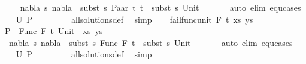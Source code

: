 \begin{isabellebody}
\ \ \isamarkupfalse%
\ {\isachardoublequoteopen}{\isasymnexists}\ nabla\ s{\isachardot}{\kern0pt}\ nabla\ {\isasymturnstile}\ subst\ s\ {\isacharparenleft}{\kern0pt}Paar\ t{}\ t{}{\isacharparenright}{\kern0pt}\ {\isasymapprox}\ subst\ s\ {\isacharparenleft}{\kern0pt}Unit{\isacharparenright}{\kern0pt}{\isachardoublequoteclose}\isanewline
\ \ \ \ \ \isamarkupfalse%
\ {\isacharparenleft}{\kern0pt}auto\ elim{\isacharcolon}{\kern0pt}\ equ{\isachardot}{\kern0pt}cases{\isacharparenright}{\kern0pt}\isanewline
\ \ \isamarkupfalse%
\ {\isachardoublequoteopen}U\ {\isacharquery}{\kern0pt}P\ {\isacharequal}{\kern0pt}\ {\isacharbraceleft}{\kern0pt}{\isacharbraceright}{\kern0pt}{\isachardoublequoteclose}\ \isanewline
\ \ \ \ \isamarkupfalse%
\ all{\isacharunderscore}{\kern0pt}solutions{\isacharunderscore}{\kern0pt}def\ \isamarkupfalse%
\ simp\isanewline
{}\isamarkupfalse%
\isanewline
\ \ \isamarkupfalse%
\ {\isacharparenleft}{\kern0pt}fail{\isacharunderscore}{\kern0pt}func{\isacharunderscore}{\kern0pt}unit\ F\ t{}\ xs\ ys{\isacharparenright}{\kern0pt}\isanewline
\ \ \isamarkupfalse%
\ {\isacharquery}{\kern0pt}P\ {\isacharequal}{\kern0pt}\ {\isachardoublequoteopen}{\isacharparenleft}{\kern0pt}Func\ F\ t{}{\isasymapprox}{\isacharquery}{\kern0pt}\ Unit\ {\isacharhash}{\kern0pt}\ xs{\isacharcomma}{\kern0pt}\ ys{\isacharparenright}{\kern0pt}{\isachardoublequoteclose}\isanewline
\ \ \isamarkupfalse%
\ {\isachardoublequoteopen}{\isasymnexists}\ nabla\ s{\isachardot}{\kern0pt}\ nabla\ {\isasymturnstile}\ subst\ s\ {\isacharparenleft}{\kern0pt}Func\ F\ t{}{\isacharparenright}{\kern0pt}\ {\isasymapprox}\ subst\ s\ {\isacharparenleft}{\kern0pt}Unit{\isacharparenright}{\kern0pt}{\isachardoublequoteclose}\isanewline
\ \ \ \ \ \isamarkupfalse%
\ {\isacharparenleft}{\kern0pt}auto\ elim{\isacharcolon}{\kern0pt}\ equ{\isachardot}{\kern0pt}cases{\isacharparenright}{\kern0pt}\isanewline
\ \ \isamarkupfalse%
\ {\isachardoublequoteopen}U\ {\isacharquery}{\kern0pt}P\ {\isacharequal}{\kern0pt}\ {\isacharbraceleft}{\kern0pt}{\isacharbraceright}{\kern0pt}{\isachardoublequoteclose}\ \isanewline
\ \ \ \ \isamarkupfalse%
\ all{\isacharunderscore}{\kern0pt}solutions{\isacharunderscore}{\kern0pt}def\ \isamarkupfalse%
\ simp\isanewline
{}\isamarkupfalse%
\isanewline
\ \ \isamarkupfalse%

\end{isabellebody}
